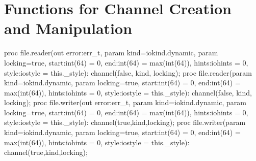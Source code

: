 \section{Functions for Channel Creation and Manipulation}
\label{IO_channel_creation}

\begin{protohead}
proc file.reader(out error:err_t, param kind=iokind.dynamic, param locking=true,
                 start:int(64) = 0, end:int(64) = max(int(64)), hints:iohints = 0,
                 style:iostyle = this._style): channel(false, kind, locking);
proc file.reader(param kind=iokind.dynamic, param locking=true,
                 start:int(64) = 0, end:int(64) = max(int(64)), hints:iohints = 0,
                 style:iostyle = this._style): channel(false, kind, locking);
proc file.writer(out error:err_t, param kind=iokind.dynamic, param locking=true,
                 start:int(64) = 0, end:int(64) = max(int(64)), hints:iohints = 0,
                 style:iostyle = this._style): channel(true,kind,locking);
proc file.writer(param kind=iokind.dynamic, param locking=true,
                 start:int(64) = 0, end:int(64) = max(int(64)), hints:iohints = 0,
                 style:iostyle = this._style): channel(true,kind,locking);
\end{protohead}
